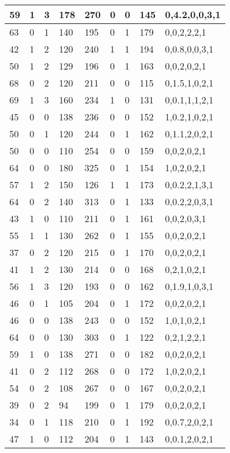 \documentclass{article}
\begin{document}
\begin{table}[h!]
\begin{tabular}{|l|l|l|l|l|l|l|l|l|}
59 & 1 & 3 & 178 & 270 & 0 & 0 & 145 & 0,4.2,0,0,3,1 \\ \hline
63 & 0 & 1 & 140 & 195 & 0 & 1 & 179 & 0,0,2,2,2,1 \\ \hline
42 & 1 & 2 & 120 & 240 & 1 & 1 & 194 & 0,0.8,0,0,3,1 \\ \hline
50 & 1 & 2 & 129 & 196 & 0 & 1 & 163 & 0,0,2,0,2,1 \\ \hline
68 & 0 & 2 & 120 & 211 & 0 & 0 & 115 & 0,1.5,1,0,2,1 \\ \hline
69 & 1 & 3 & 160 & 234 & 1 & 0 & 131 & 0,0.1,1,1,2,1 \\ \hline
45 & 0 & 0 & 138 & 236 & 0 & 0 & 152 & 1,0.2,1,0,2,1 \\ \hline
50 & 0 & 1 & 120 & 244 & 0 & 1 & 162 & 0,1.1,2,0,2,1 \\ \hline
50 & 0 & 0 & 110 & 254 & 0 & 0 & 159 & 0,0,2,0,2,1 \\ \hline
64 & 0 & 0 & 180 & 325 & 0 & 1 & 154 & 1,0,2,0,2,1 \\ \hline
57 & 1 & 2 & 150 & 126 & 1 & 1 & 173 & 0,0.2,2,1,3,1 \\ \hline
64 & 0 & 2 & 140 & 313 & 0 & 1 & 133 & 0,0.2,2,0,3,1 \\ \hline
43 & 1 & 0 & 110 & 211 & 0 & 1 & 161 & 0,0,2,0,3,1 \\ \hline
55 & 1 & 1 & 130 & 262 & 0 & 1 & 155 & 0,0,2,0,2,1 \\ \hline
37 & 0 & 2 & 120 & 215 & 0 & 1 & 170 & 0,0,2,0,2,1 \\ \hline
41 & 1 & 2 & 130 & 214 & 0 & 0 & 168 & 0,2,1,0,2,1 \\ \hline
56 & 1 & 3 & 120 & 193 & 0 & 0 & 162 & 0,1.9,1,0,3,1 \\ \hline
46 & 0 & 1 & 105 & 204 & 0 & 1 & 172 & 0,0,2,0,2,1 \\ \hline
46 & 0 & 0 & 138 & 243 & 0 & 0 & 152 & 1,0,1,0,2,1 \\ \hline
64 & 0 & 0 & 130 & 303 & 0 & 1 & 122 & 0,2,1,2,2,1 \\ \hline
59 & 1 & 0 & 138 & 271 & 0 & 0 & 182 & 0,0,2,0,2,1 \\ \hline
41 & 0 & 2 & 112 & 268 & 0 & 0 & 172 & 1,0,2,0,2,1 \\ \hline
54 & 0 & 2 & 108 & 267 & 0 & 0 & 167 & 0,0,2,0,2,1 \\ \hline
39 & 0 & 2 & 94 & 199 & 0 & 1 & 179 & 0,0,2,0,2,1 \\ \hline
34 & 0 & 1 & 118 & 210 & 0 & 1 & 192 & 0,0.7,2,0,2,1 \\ \hline
47 & 1 & 0 & 112 & 204 & 0 & 1 & 143 & 0,0.1,2,0,2,1 \\ \hline

\end{tabular}
\end{table}
\end{document}
